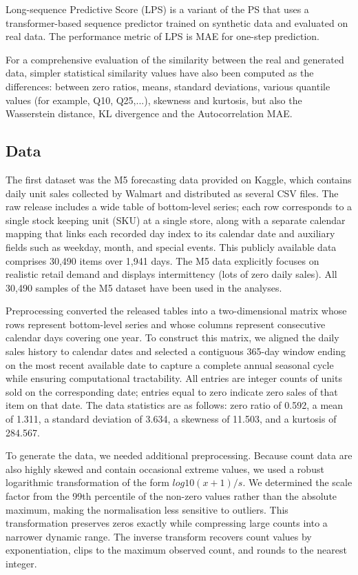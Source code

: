 \documentclass[make,article,submit,moreauthors]{Definitions/mdpi}
\begin{document}
Long-sequence Predictive Score (LPS)  \cite{ref29} is a variant of the PS that uses a transformer-based sequence predictor trained on synthetic data and evaluated on real data. The performance metric of LPS is MAE for one-step prediction.

For a comprehensive evaluation of the similarity between the real and generated data, simpler statistical similarity values have also been computed as the differences: between zero ratios, means, standard deviations,  various quantile values (for example, Q10, Q25,...), skewness and kurtosis, but also the Wasserstein distance, KL divergence and the Autocorrelation MAE.

\subsection{Data}
The first dataset was the M5 forecasting data \cite{ref38} provided on Kaggle, which contains daily unit sales collected by Walmart and distributed as several CSV files. The raw release includes a wide table of bottom-level series; each row corresponds to a single stock keeping unit (SKU) at a single store, along with a separate calendar mapping that links each recorded day index to its calendar date and auxiliary fields such as weekday, month, and special events. This publicly available data comprises 30,490 items over 1,941 days. The M5 data explicitly focuses on realistic retail demand and displays intermittency (lots of zero daily sales). All 30,490 samples of the M5 dataset have been used in the analyses.

Preprocessing converted the released tables into a two-dimensional matrix whose rows represent bottom-level series and whose columns represent consecutive calendar days covering one year. To construct this matrix, we aligned the daily sales history to calendar dates and selected a contiguous 365-day window ending on the most recent available date to capture a complete annual seasonal cycle while ensuring computational tractability. All entries are integer counts of units sold on the corresponding date; entries equal to zero indicate zero sales of that item on that date. The data statistics are as follows: zero ratio of 0.592, a mean of 1.311, a standard deviation of 3.634, a skewness of 11.503, and a kurtosis of 284.567.

To generate the data, we needed additional preprocessing. Because count data are also highly skewed and contain occasional extreme values, we used a robust logarithmic transformation of the form $log10(x+1)/s$. We determined the scale factor from the 99th percentile of the non-zero values rather than the absolute maximum, making the normalisation less sensitive to outliers. This transformation preserves zeros exactly while compressing large counts into a narrower dynamic range. The inverse transform recovers count values by exponentiation, clips to the maximum observed count, and rounds to the nearest integer.
\end{document}
